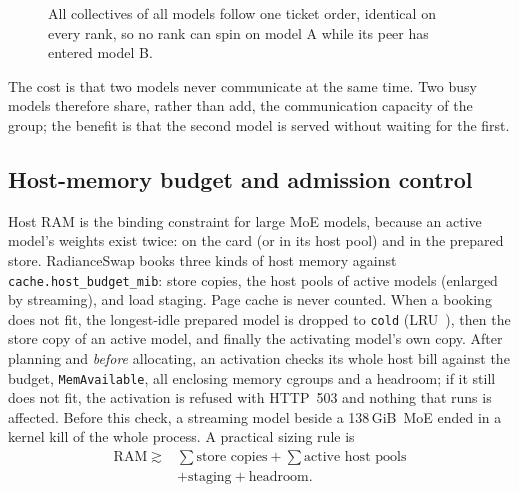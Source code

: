 \documentclass[10pt,conference,a4paper]{IEEEtran}
\newcommand{\code}[1]{\texttt{#1}}
\newcommand{\GiB}{\,GiB}
\begin{document}
\begin{figure}[t]
\centering
{}
\caption{All collectives of all models follow one ticket order, identical on every rank, so no rank
can spin on model A while its peer has entered model B.}
\label{fig:collective}
\end{figure}

The cost is that two models never communicate at the same time. Two busy models therefore share,
rather than add, the communication capacity of the group; the benefit is that the second model is
served without waiting for the first.

\subsection{Host-memory budget and admission control}\label{sec:host}

Host RAM is the binding constraint for large MoE models, because an active model's weights exist
twice: on the card (or in its host pool) and in the prepared store. RadianceSwap books three kinds of
host memory against \code{cache.host\_budget\_mib}: store copies, the host pools of active models
(enlarged by streaming), and load staging. Page cache is never counted. When a booking does not fit,
the longest-idle prepared model is dropped to \code{cold} (LRU~\cite{denning1968}), then the store
copy of an active model, and finally the activating model's own copy. After planning and
\emph{before} allocating, an activation checks its whole host bill against the budget,
\code{MemAvailable}, all enclosing memory cgroups and a headroom; if it still does not fit, the
activation is refused with HTTP~503 and nothing that runs is affected. Before this check, a streaming
model beside a 138\GiB\ MoE ended in a kernel kill of the whole process. A practical sizing rule is
\begin{equation*}
\begin{aligned}
\mathrm{RAM} \gtrsim{} & \textstyle\sum \text{store copies} + \sum \text{active host pools}\\
 & + \text{staging} + \text{headroom}.
\end{aligned}
\end{equation*}
\end{document}
